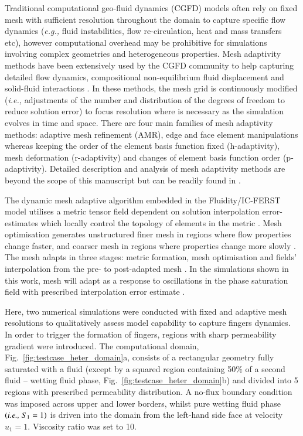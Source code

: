 \documentclass[preprint,authoryear,12pt]{elsarticle}
\newcommand{\eg}{{\it e.g., }}
\newcommand{\ie}{{\it i.e., }}
\begin{document}
\medskip
Traditional computational geo-fluid dynamics (CGFD) models often rely on fixed mesh with sufficient resolution throughout the domain to capture specific flow dynamics (\eg fluid instabilities, flow re-circulation, heat and mass transfers etc), however computational overhead may be prohibitive for simulations involving complex geometries and heterogeneous properties.  Mesh adaptivity methods have been extensively used by the CGFD community to help capturing detailed flow dynamics, compositional non-equilibrium fluid displacement and solid-fluid interactions \citep{pluszny_2007,pietro_2014,su_2016,melnikova_2016}. In these methods, the mesh grid is continuously modified (\ie adjustments of the number and distribution of the degrees of freedom to reduce solution error) to focus resolution where is necessary as the simulation evolves in time and space. There are four main families of mesh adaptivity methods: adaptive mesh refinement (AMR), edge and face element manipulations whereas keeping the order of the element basis function fixed (h-adaptivity), mesh deformation (r-adaptivity) and changes of element basis function order (p-adaptivity). Detailed description and analysis of mesh adaptivity methods are beyond the scope of this manuscript but can be readily found in \citet{lo_book} \citep[see also][]{plewa_book,frey_book}.  

\medskip
The dynamic mesh adaptive algorithm embedded in the Fluidity/IC-FERST model utilises a metric tensor field dependent on solution interpolation error-estimates which locally control the topology of elements in the metric \citep{pain_2001,power_2006}. Mesh optimisation generates unstructured finer mesh in regions where flow properties change faster, and coarser mesh in regions where properties change more slowly \citep{piggott_2006}. The mesh adapts in three stages: metric formation, mesh optimisation and fields' interpolation from the pre- to post-adapted mesh \citep[see][]{hiester_2014}. In the simulations shown in this work, mesh will adapt as a response to oscillations in the phase saturation field with prescribed interpolation error estimate \citep{mostaghimi_2016}.

\medskip
Here, two numerical simulations were conducted with fixed and adaptive mesh resolutions to qualitatively assess model capability to capture fingers dynamics. In order to trigger the formation of fingers, regions with sharp permeability gradient were introduced. The computational domain, Fig.~\ref{fig:testcase_heter_domain}a, consists of a rectangular geometry fully saturated with a fluid (except by a squared region containing 50$\%$ of a second fluid -- wetting fluid phase, Fig.~\ref{fig:testcase_heter_domain}b) and divided into 5 regions with prescribed permeability distribution. A no-flux boundary condition was imposed across upper and lower borders, whilst pure wetting fluid phase $\left(\text{\ie} S_{1}=1\right)$ is driven into the domain from the left-hand side face at velocity $u_{1}=1$. Viscosity ratio was set to 10.
\end{document}
